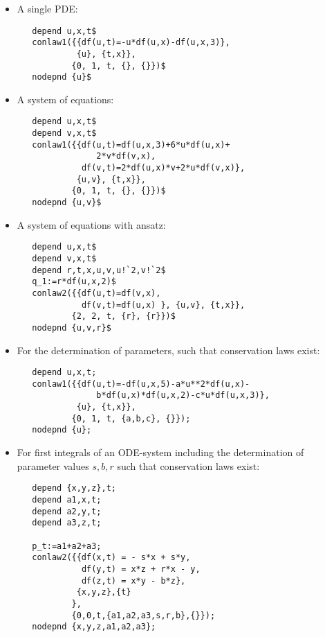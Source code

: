 \begin{itemize}
\item A single PDE:
\begin{verbatim}
   depend u,x,t$
   conlaw1({{df(u,t)=-u*df(u,x)-df(u,x,3)},
            {u}, {t,x}},
           {0, 1, t, {}, {}})$
   nodepnd {u}$
\end{verbatim}

\item A system of equations:
\begin{verbatim}
   depend u,x,t$
   depend v,x,t$
   conlaw1({{df(u,t)=df(u,x,3)+6*u*df(u,x)+
                2*v*df(v,x),
             df(v,t)=2*df(u,x)*v+2*u*df(v,x)},
            {u,v}, {t,x}},
           {0, 1, t, {}, {}})$
   nodepnd {u,v}$
\end{verbatim}

\item A system of equations with ansatz:
\begin{verbatim}
   depend u,x,t$
   depend v,x,t$
   depend r,t,x,u,v,u!`2,v!`2$
   q_1:=r*df(u,x,2)$
   conlaw2({{df(u,t)=df(v,x),
             df(v,t)=df(u,x) }, {u,v}, {t,x}},
           {2, 2, t, {r}, {r}})$
   nodepnd {u,v,r}$
\end{verbatim}

\item For the determination of parameters, such that conservation laws
  exist:
\begin{verbatim}
   depend u,x,t;
   conlaw1({{df(u,t)=-df(u,x,5)-a*u**2*df(u,x)-
                b*df(u,x)*df(u,x,2)-c*u*df(u,x,3)},
            {u}, {t,x}},
           {0, 1, t, {a,b,c}, {}});
   nodepnd {u};
\end{verbatim}

\item For first integrals of an ODE-system including the determination
  of parameter values $s,b,r$ such that conservation laws exist:
\begin{verbatim}
   depend {x,y,z},t;
   depend a1,x,t;
   depend a2,y,t;
   depend a3,z,t;

   p_t:=a1+a2+a3;
   conlaw2({{df(x,t) = - s*x + s*y,
             df(y,t) = x*z + r*x - y,
             df(z,t) = x*y - b*z},
            {x,y,z},{t}
           },
           {0,0,t,{a1,a2,a3,s,r,b},{}});
   nodepnd {x,y,z,a1,a2,a3};
\end{verbatim}

\end{itemize}
